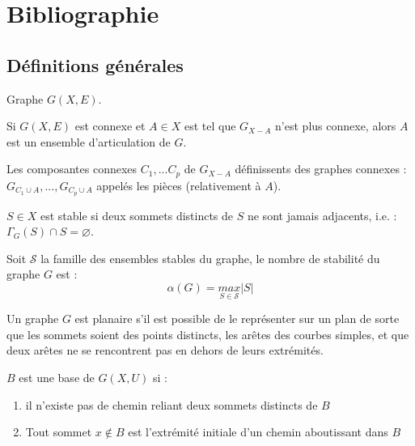 \section{Bibliographie}
\subsection{Définitions générales}
Graphe $G(X,E)$.

\begin{defin}
Si $G(X,E)$ est connexe et $A \in X$ est tel que $G_{X-A}$ n'est plus connexe,
alors $A$ est un ensemble d'articulation de $G$.
\end{defin}

\begin{defin}[Pièces]
Les composantes connexes $C_1,...C_p$ de $G_{X-A}$ définissents des graphes connexes :
$G_{C_1 \cup A},..., G_{C_p \cup A}$ appelés les pièces (relativement à $A$).
\end{defin}

\begin{defin}[Stable]
$S\in X$ est stable si deux sommets distincts de $S$ ne sont jamais adjacents, i.e. :
$\Gamma_G(S) \cap S = \varnothing$.
\end{defin}

\begin{defin}
Soit $\mathcal{S}$ la famille des ensembles stables du graphe, le nombre de stabilité du graphe $G$ est :
$$\alpha(G)=\underset{S\in\mathcal{S}}{max}|S|$$
\end{defin}

\begin{defin}
Un graphe $G$ est planaire s'il est possible de le représenter sur un plan de sorte que
les sommets soient des points distincts, les arêtes des courbes simples, et que deux arêtes
ne se rencontrent pas en dehors de leurs extrémités.
\end{defin}

\begin{defin}
$B$ est une base de $G(X,U)$ si :
\begin{enumerate}
 \item il n'existe pas de chemin reliant deux sommets distincts de $B$
 \item Tout sommet $x \notin B$ est l'extrémité initiale d'un chemin aboutissant dans $B$
\end{enumerate}
\end{defin}

